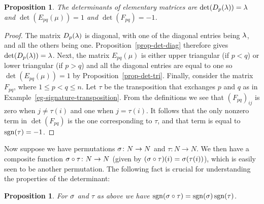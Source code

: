 \documentclass[reqno]{amsart}
\newtheorem{proposition}[theorem]{Proposition}
\theoremstyle{definition}
\begin{document}
\begin{proposition}\label{prop-det-elem}
 The determinants of elementary matrices are $\det(D_p(\lambda))=\lambda$ and
 $\det(E_{pq}(\mu))=1$ and $\det(F_{pq})=-1$.
\end{proposition}
\begin{proof}
 The matrix $D_p(\lambda)$ is diagonal, with one of the diagonal entries
 being $\lambda$, and all the others being one.
 Proposition~\ref{prop-det-diag} therefore gives $\det(D_p(\lambda))=\lambda$.
 Next, the matrix $E_{pq}(\mu)$ is either upper triangular (if $p<q$)
 or lower triangular (if $p>q$) and all the diagonal entries are equal
 to one so $\det(E_{pq}(\mu))=1$ by Proposition~\ref{prop-det-tri}.
 Finally, consider the matrix $F_{pq}$, where $1\leq p<q\leq n$.  Let
 $\tau$ be the transposition that exchanges $p$ and $q$ as in
 Example~\ref{eg-signature-transposition}.  From the definitions we
 see that $(F_{pq})_{ij}$ is zero when $j\neq\tau(i)$ and one when
 $j=\tau(i)$.  It follows that the only nonzero term in $\det(F_{pq})$
 is the one corresponding to $\tau$, and that term is equal to
 $\operatorname{sgn}(\tau)=-1$.
\end{proof}

Now suppose we have permutations $\sigma\colon N\to N$ and $\tau\colon N\to N$.  We
then have a composite function $\sigma\circ\tau\colon N\to N$ (given by
$(\sigma\circ\tau)(i)=\sigma(\tau(i))$), which is easily seen to be another
permutation. The following fact is crucial for understanding the
properties of the determinant:
\begin{proposition}\label{prop-sgn-circ}
 For $\sigma$ and $\tau$ as above we have
 $\operatorname{sgn}(\sigma\circ\tau)=\operatorname{sgn}(\sigma)\operatorname{sgn}(\tau)$.
\end{proposition}
\end{document}
